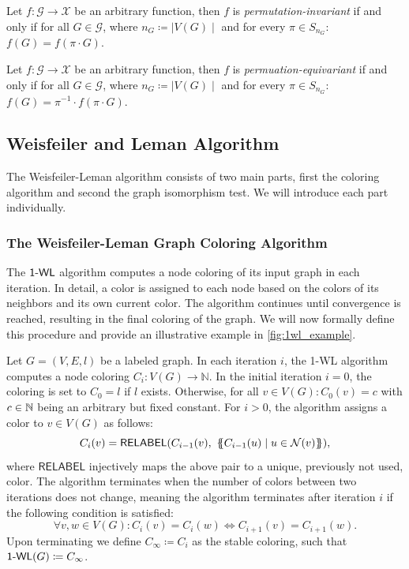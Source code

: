 \begin{definition}
    Let $f: \mathcal{G} \rightarrow \mathcal{X}$ be an arbitrary function, then $f$ is \textit{permutation-invariant} if and only if for all $G \in \mathcal{G}$, where $n_G \coloneqq \mid V(G) \mid$ and for every $\pi \in S_{n_G}$: $f(G) = f(\pi \cdot G)$.
\end{definition}

\begin{definition}
    Let $f: \mathcal{G} \rightarrow \mathcal{X}$ be an arbitrary function, then $f$ is \textit{permuation-equivariant} if and only if for all $G \in \mathcal{G}$, where $n_G \coloneqq \mid V(G) \mid$ and for every $\pi \in S_{n_G}$: $f(G) = \pi^{-1} \cdot f(\pi \cdot G)$.
\end{definition}

\subsection{Weisfeiler and Leman Algorithm}\label{sec:1-WL Definition}
The Weisfeiler-Leman algorithm consists of two main parts, first the coloring algorithm and second the graph isomorphism test. We will introduce each part individually.

\subsubsection{The Weisfeiler-Leman Graph Coloring Algorithm}
The $\wl$ algorithm computes a node coloring of its input graph in each iteration. In detail, a color is assigned to each node based on the colors of its neighbors and its own current color. The algorithm continues until convergence is reached, resulting in the final coloring of the graph. We will now formally define this procedure and provide an illustrative example in \cref{fig:1wl_example}.

\begin{definition}[$\wl$ Algorithm]
    Let $G = (V, E, l)$ be a labeled graph. In each iteration $i$, the 1-WL algorithm computes a node coloring $C_i: V(G) \rightarrow \mathbb{N}$. In the initial iteration $i=0$, the coloring is set to $C_0 = l$ if $l$ exists. Otherwise, for all $v \in V(G): C_0(v) = c$ with $c \in \mathbb{N}$ being an arbitrary but fixed constant. For $i > 0$, the algorithm assigns a color to $v \in V(G)$ as follows:
    \begin{equation*}
        C_i (v) = \textsf{RELABEL}(C_{i-1}(v),  \ \{\!\!\{ C_{i-1}(u) \mid u \in \mathcal{N}(v) \}\!\!\}),
    \end{equation*}
    where $\textsf{RELABEL}$ injectively maps the above pair to a unique, previously not used, color. The algorithm terminates when the number of colors between two iterations does not change, meaning the algorithm terminates after iteration $i$ if the following condition is satisfied:
    \begin{equation*}
        \forall v,w \in V(G):  C_i(v) = C_i(w) \iff C_{i+1}(v) = C_{i+1}(w).
    \end{equation*}
    Upon terminating we define $C_{\infty} \coloneqq C_i$ as the stable coloring, such that $\textsf{1-WL}(G) \coloneqq C_\infty$.
\end{definition}

